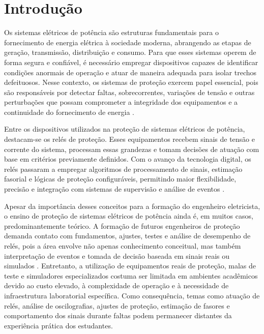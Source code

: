 \chapter{Introdução}

Os sistemas elétricos de potência são estruturas fundamentais para o fornecimento de energia elétrica à sociedade moderna, abrangendo as etapas de geração, transmissão, distribuição e consumo. Para que esses sistemas operem de forma segura e confiável, é necessário empregar dispositivos capazes de identificar condições anormais de operação e atuar de maneira adequada para isolar trechos defeituosos. Nesse contexto, os sistemas de proteção exercem papel essencial, pois são responsáveis por detectar faltas, sobrecorrentes, variações de tensão e outras perturbações que possam comprometer a integridade dos equipamentos e a continuidade do fornecimento de energia \cite{anderson1999power,blackburn2006protective}.

Entre os dispositivos utilizados na proteção de sistemas elétricos de potência, destacam-se os relés de proteção. Esses equipamentos recebem sinais de tensão e corrente do sistema, processam essas grandezas e tomam decisões de atuação com base em critérios previamente definidos. Com o avanço da tecnologia digital, os relés passaram a empregar algoritmos de processamento de sinais, estimação fasorial e lógicas de proteção configuráveis, permitindo maior flexibilidade, precisão e integração com sistemas de supervisão e análise de eventos \cite{phadke2009computer,horowitz2014power}.

Apesar da importância desses conceitos para a formação do engenheiro eletricista, o ensino de proteção de sistemas elétricos de potência ainda é, em muitos casos, predominantemente teórico. A formação de futuros engenheiros de proteção demanda contato com fundamentos, ajustes, testes e análise de desempenho de relés, pois a área envolve não apenas conhecimento conceitual, mas também interpretação de eventos e tomada de decisão baseada em sinais reais ou simulados \cite{brahma2009education}. Entretanto, a utilização de equipamentos reais de proteção, malas de teste e simuladores especializados costuma ser limitada em ambientes acadêmicos devido ao custo elevado, à complexidade de operação e à necessidade de infraestrutura laboratorial específica. Como consequência, temas como atuação de relés, análise de oscilografias, ajustes de proteção, estimação de fasores e comportamento dos sinais durante faltas podem permanecer distantes da experiência prática dos estudantes.

